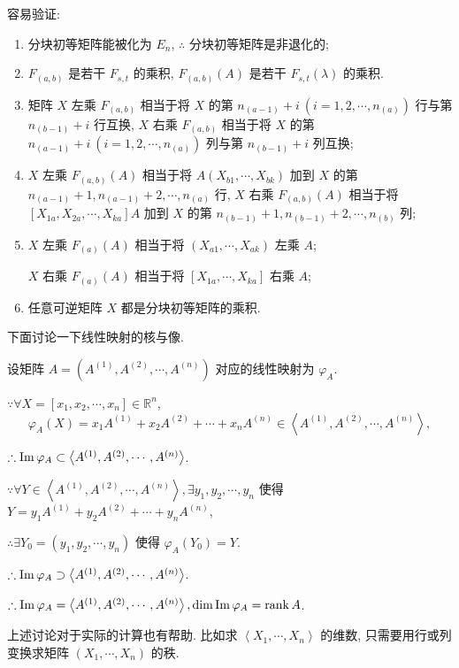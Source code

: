 \documentclass[color=black,device=normal,lang=cn,mode=geye]{elegantnote}
\begin{document}
容易验证:
\begin{theorem}
    \begin{enumerate}
        \def\labelenumi{(\arabic{enumi})}
        \item 分块初等矩阵能被化为 $E_n$, $\therefore$ 分块初等矩阵是非退化的;
        \item $F_{(a,b)}$ 是若干 $F_{s,t}$ 的乘积, $F_{(a,b)}(A)$ 是若干 $F_{s,t}(\lambda)$ 的乘积.
        \item 矩阵 $X$ 左乘 $F_{(a,b)}$ 相当于将 $X$ 的第 $n_{(a-1)}+i\ (i=1,2,\cdots,n_{(a)})$ 行与第 $n_{(b-1)}+i$ 行互换, $X$ 右乘 $F_{(a,b)}$ 相当于将 $X$ 的第 $n_{(a-1)}+i\ (i=1,2,\cdots,n_{(a)})$ 列与第 $n_{(b-1)}+i$ 列互换;
        \item $X$ 左乘 $F_{(a,b)}(A)$ 相当于将 $A(X_{b1},\cdots,X_{bk})$ 加到 $X$ 的第 $n_{(a-1)}+1,n_{(a-1)}+2,\cdots,n_{(a)}$ 行, $X$ 右乘 $F_{(a,b)}(A)$ 相当于将 $[X_{1a},X_{2a},\cdots,X_{ka}]A$ 加到 $X$ 的第 $n_{(b-1)}+1,n_{(b-1)}+2,\cdots,n_{(b)}$ 列;
        \item $X$ 左乘 $F_{(a)}(A)$ 相当于将 $(X_{a1},\cdots,X_{ak})$ 左乘 $A$;
        
        $X$ 右乘 $F_{(a)}(A)$ 相当于将 $[X_{1a},\cdots,X_{ka}]$ 右乘 $A$;
        \item 任意可逆矩阵 $X$ 都是分块初等矩阵的乘积.
    \end{enumerate}
\end{theorem}

下面讨论一下线性映射的核与像.

设矩阵 $A=(A^{(1)},A^{(2)},\cdots,A^{(n)})$ 对应的线性映射为 $\varphi_A$.

$\because\forall X=[x_1,x_2,\cdots,x_n]\in\mathbb{R}^n$,
\[\varphi_A(X)=x_1A^{(1)}+x_2A^{(2)}+\cdots+x_nA^{(n)}\in\left<A^{(1)},A^{(2)},\cdots,A^{(n)}\right>,\]

$\therefore\operatorname{Im} \varphi_A\subset\left<A^{(1)},A^{(2)},\cdots,A^{(n)}\right>$.

$\because\forall Y\in\left<A^{(1)},A^{(2)},\cdots,A^{(n)}\right>,\exists y_1,y_2,\cdots,y_n$ 使得 $Y=y_1A^{(1)}+y_2A^{(2)}+\cdots+y_nA^{(n)}$,

$\therefore\exists Y_0=(y_1,y_2,\cdots,y_n)$ 使得 $\varphi_A(Y_0)=Y$.

$\therefore\operatorname{Im} \varphi_A\supset\left<A^{(1)},A^{(2)},\cdots,A^{(n)}\right>$.

$\therefore\operatorname{Im} \varphi_A=\left<A^{(1)},A^{(2)},\cdots,A^{(n)}\right>,\dim\operatorname{Im} \varphi_A=\operatorname{rank} A$.

上述讨论对于实际的计算也有帮助. 比如求 $\left<X_1,\cdots,X_n\right>$ 的维数, 只需要用行或列变换求矩阵 $(X_1,\cdots,X_n)$ 的秩.
\end{document}
